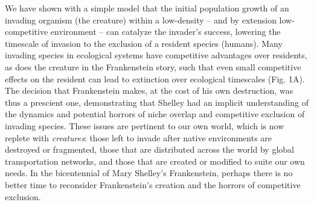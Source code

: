 \documentclass{article}[10pt]
\begin{document}

We have shown with a simple model that the initial population growth of an invading organism (the creature) within a low-density -- and by extension low-competitive environment -- can catalyze the invader's success, lowering the timescale of invasion to the exclusion of a resident species (humans).
Many invading species in ecological systems have competitive advantages over residents, as does the creature in the Frankenstein story, such that even small competitive effects on the resident can lead to extinction over ecological timescales (Fig. 1A).
The decision that Frankenstein makes, at the cost of his own destruction, was thus a prescient one, demonstrating that Shelley had an implicit understanding of the dynamics and potential horrors of niche overlap and competitive exclusion of invading species.
These issues are pertinent to our own world, which is now replete with \emph{creatures}:
those left to invade after native environments are destroyed or fragmented,
those that are distributed across the world by global transportation networks,
and those that are created or modified to suite our own needs.
In the bicentennial of Mary Shelley's Frankenstein, perhaps there is no better time to reconsider Frankenstein's creation and the horrors of competitive exclusion.
\end{document}
